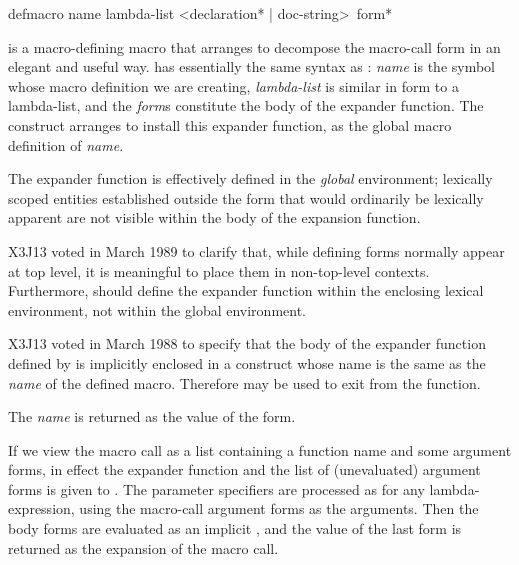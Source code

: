 \begin{defmac}
defmacro name lambda-list <{declaration}* | doc-string> {\,form}*

 is a macro-defining macro that
arranges to decompose the macro-call form in an elegant and useful way.
 has essentially the same syntax as : {\it name} is the
symbol whose macro definition we are creating, {\it lambda-list} is similar in
form to a lambda-list, and
the {\it form\/}s constitute the body of the expander function.
The  construct arranges to install this expander function,
as the global macro definition of {\it name}.

\begin{obsolete}
The expander function
is effectively defined in the {\it global} environment;
lexically scoped entities established
outside the  form that would ordinarily be lexically apparent
are not visible within the body of the expansion function.
\end{obsolete}

\begin{newer}
X3J13 voted in March 1989 
to clarify that, while defining forms normally appear at top level,
it is meaningful to place them in non-top-level contexts.
Furthermore,  should define the expander function
within the enclosing lexical environment, not within the global
environment.
\end{newer}

\begin{newer}
X3J13 voted in March 1988 
to specify that the body of the expander function defined
by  is implicitly enclosed in a  construct
whose name is the same as the {\it name} of the defined macro.
Therefore  may be used to exit from the function.
\end{newer}

The {\it name} is returned
as the value of the  form.

If we view the 
macro call as a list containing a function name and some argument forms,
in effect the expander function and the list of (unevaluated) argument
forms is given to .
The parameter specifiers are processed as for any lambda-expression,
using the macro-call argument forms as the arguments.
Then the body forms are evaluated
as an implicit , and the value of the last form
is returned as the expansion of the macro call.


\end{defmac}
